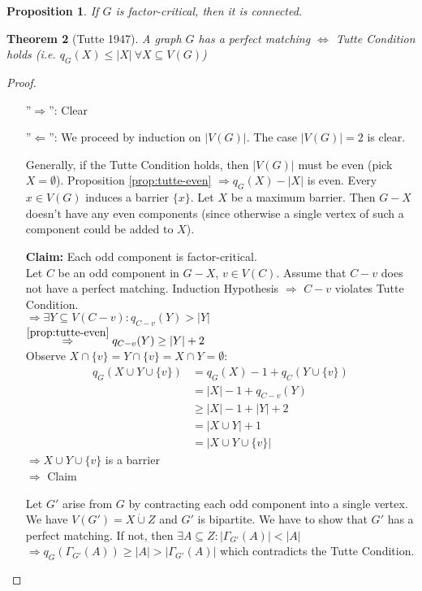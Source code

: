 \documentclass[11pt, a4paper]{article}
\newcommand{\abs}[1]{\left\lvert#1\right\rvert}
\newtheorem{theorem}{Theorem}[section]
\newtheorem{prop}[theorem]{Proposition}
\theoremstyle{remark}
\theoremstyle{definition}
\begin{document}
\begin{prop}\label{prop:factor-critical-conn}
	 If $G$ is factor-critical, then it is connected.
\end{prop}

\begin{theorem}[Tutte 1947]
	A graph $G$ has a perfect matching $\Leftrightarrow$ Tutte Condition
	holds (i.e. $q_G(X)\leq\abs{X}\ \forall X\subseteq V(G)$)
\end{theorem}
\begin{proof}\ 
\begin{enumerate}
	\item[''$\Rightarrow$'':] Clear
	\item[''$\Leftarrow$'':] We proceed by induction on $\abs{V(G)}$.
	The case $\abs{V(G)}=2$ is clear.
	
	Generally, if the Tutte Condition holds, then $\abs{V(G)}$ must be
	even (pick $X=\emptyset$).
	Proposition \ref{prop:tutte-even} $\Rightarrow q_G(X)-\abs{X}$ is even.
	Every $x\in V(G)$ induces a barrier $\{x\}$. Let $X$ be a maximum
	barrier. Then $G-X$ doesn't have any even components (since otherwise
	a single vertex of such a component could be added to $X$).
	
	\textbf{Claim:} Each odd component is factor-critical. \\
	Let $C$ be an odd component in $G-X$, $v\in V(C)$. Assume that $C-v$
	does not have a perfect matching. Induction Hypothesis $\Rightarrow$
	$C-v$ violates Tutte Condition. \\
	$\Rightarrow \exists Y\subseteq V(C-v): q_{C-v}(Y)>\abs{Y}$ \\
	$\stackrel{\ref{prop:tutte-even}}{\Rightarrow} q_{C-v}(Y)\geq \abs{Y}+2$ \\
	Observe $X\cap\{v\}=Y\cap\{v\}=X\cap Y=\emptyset$:
	\begin{align*}
	q_G(X\cup Y\cup\{v\})&=q_G(X)-1+q_C(Y\cup\{v\}) \\
	&=\abs{X}-1+q_{C-v}(Y) \\
	&\geq\abs{X}-1+\abs{Y}+2 \\
	&=\abs{X\cup Y}+1 \\
	&=\abs{X\cup Y\cup\{v\}}
	\end{align*}
	$\Rightarrow X\cup Y\cup\{v\}$ is a barrier \\
	$\Rightarrow$ Claim
	
	Let $G'$ arise from $G$ by contracting each odd component into a
	single vertex. We have $V(G')=X\dot\cup Z$ and $G'$ is bipartite.
	We have to show that $G'$ has a perfect matching. If not, then
	$\exists A\subseteq Z: \abs{\Gamma_{G'}(A)}<\abs{A}$ \\
	$\Rightarrow q_G(\Gamma_{G'}(A))\geq \abs{A}>\abs{\Gamma_{G'}(A)}$
	which contradicts the Tutte Condition.
\end{enumerate}
\end{proof}
\end{document}
